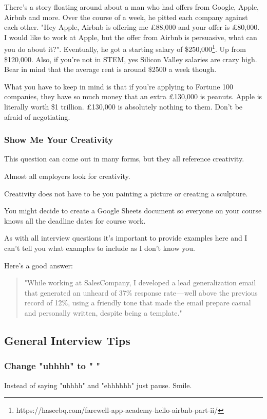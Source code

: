 \documentclass{article}
\begin{document}
There's a story floating around about a man who had offers from Google,
Apple, Airbnb and more. Over the course of a week, he pitted each
company against each other. "Hey Apple, Airbnb is offering me £88,000
and your offer is £80,000. I would like to work at Apple, but the offer
from Airbnb is persuasive, what can you do about it?". Eventually, he
got a starting salary of \$250,000\footnote{https://haseebq.com/farewell-app-academy-hello-airbnb-part-ii/}.
Up from \$120,000. Also, if you're not in STEM, yes Silicon Valley
salaries are crazy high. Bear in mind that the average rent is around
\$2500 a week though.

What you have to keep in mind is that if you're applying to Fortune 100
companies, they have so much money that an extra £130,000 is peanuts.
Apple is literally worth \$1 trillion. £130,000 is absolutely nothing to
them. Don't be afraid of negotiating.

\subsubsection{Show Me Your Creativity}
This question can come out in many forms, but they all reference
creativity.

Almost all employers look for creativity.

Creativity does not have to be you painting a picture or creating a
sculpture.

You might decide to create a Google Sheets document so everyone on your
course knows all the deadline dates for course work.

As with all interview questions it's important to provide examples here
and I can't tell you what examples to include as I don't know you.

Here's a good answer:
\begin{quote}
    "While working at SalesCompany, I developed a lead generalization email
that generated an unheard of 37\% response rate --- well above the
previous record of 12\%, using a friendly tone that made the email
prepare casual and personally written, despite being a template."
\end{quote}
\subsection{General Interview Tips}
\subsubsection{Change "uhhhh" to " "}
Instead of saying "uhhhh" and "ehhhhhh" just pause. Smile.
\end{document}
